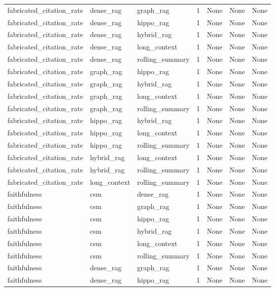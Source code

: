 \begin{tabular}{lllllll}
fabricated\_citation\_rate & dense\_rag & graph\_rag & 1 & None & None & None \\
fabricated\_citation\_rate & dense\_rag & hippo\_rag & 1 & None & None & None \\
fabricated\_citation\_rate & dense\_rag & hybrid\_rag & 1 & None & None & None \\
fabricated\_citation\_rate & dense\_rag & long\_context & 1 & None & None & None \\
fabricated\_citation\_rate & dense\_rag & rolling\_summary & 1 & None & None & None \\
fabricated\_citation\_rate & graph\_rag & hippo\_rag & 1 & None & None & None \\
fabricated\_citation\_rate & graph\_rag & hybrid\_rag & 1 & None & None & None \\
fabricated\_citation\_rate & graph\_rag & long\_context & 1 & None & None & None \\
fabricated\_citation\_rate & graph\_rag & rolling\_summary & 1 & None & None & None \\
fabricated\_citation\_rate & hippo\_rag & hybrid\_rag & 1 & None & None & None \\
fabricated\_citation\_rate & hippo\_rag & long\_context & 1 & None & None & None \\
fabricated\_citation\_rate & hippo\_rag & rolling\_summary & 1 & None & None & None \\
fabricated\_citation\_rate & hybrid\_rag & long\_context & 1 & None & None & None \\
fabricated\_citation\_rate & hybrid\_rag & rolling\_summary & 1 & None & None & None \\
fabricated\_citation\_rate & long\_context & rolling\_summary & 1 & None & None & None \\
faithfulness & csm & dense\_rag & 1 & None & None & None \\
faithfulness & csm & graph\_rag & 1 & None & None & None \\
faithfulness & csm & hippo\_rag & 1 & None & None & None \\
faithfulness & csm & hybrid\_rag & 1 & None & None & None \\
faithfulness & csm & long\_context & 1 & None & None & None \\
faithfulness & csm & rolling\_summary & 1 & None & None & None \\
faithfulness & dense\_rag & graph\_rag & 1 & None & None & None \\
faithfulness & dense\_rag & hippo\_rag & 1 & None & None & None \\

\end{tabular}
